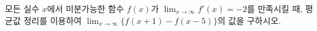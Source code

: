 모든 실수 $x$에서 미분가능한 함수 $f(x)$가 $\displaystyle\lim_{x\to\infty} f'(x)=-2$를 만족시킬 때, 평균값 정리를 이용하여 $\displaystyle\lim_{x\to\infty}\{f(x+1)-f(x-5)\}$의 값을 구하시오.

